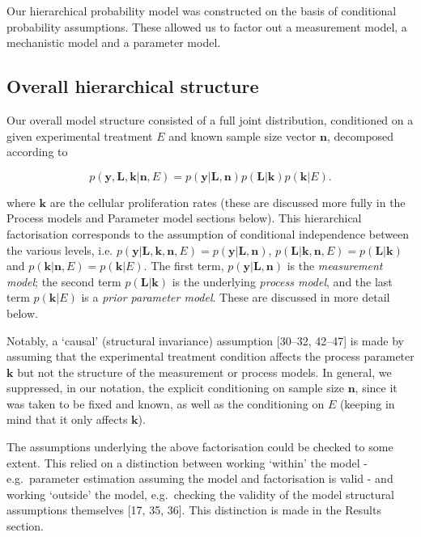 \documentclass[10pt,letterpaper]{article}
\begin{document}
Our hierarchical probability model was constructed on the basis of
conditional probability assumptions. These allowed us to factor out a
measurement model, a mechanistic model and a parameter model.

\subsection{Overall hierarchical
structure}\label{overall-hierarchical-structure}

Our overall model structure consisted of a full joint distribution,
conditioned on a given experimental treatment \(E\) and known sample
size vector \(\mathbf{n}\), decomposed according to

\begin{equation}p(\mathbf{y},\mathbf{L},\mathbf{k}|\mathbf{n},E) = p(\mathbf{y}|\mathbf{L},\mathbf{n})p(\mathbf{L}|\mathbf{k})p(\mathbf{k}|E).\label{eq:decomp}\end{equation}

where \(\mathbf{k}\) are the cellular proliferation rates (these are
discussed more fully in the Process models and Parameter model sections
below). This hierarchical factorisation corresponds to the assumption of
conditional independence between the various levels, i.e.
\(p(\mathbf{y}|\mathbf{L},\mathbf{k},\mathbf{n},E) = p(\mathbf{y}|\mathbf{L},\mathbf{n})\),
\(p(\mathbf{L}|\mathbf{k},\mathbf{n},E) = p(\mathbf{L}|\mathbf{k})\) and
\(p(\mathbf{k}|\mathbf{n},E) = p(\mathbf{k}|E)\). The first term,
\(p(\mathbf{y}|\mathbf{L},\mathbf{n})\) is the \emph{measurement model};
the second term \(p(\mathbf{L}|\mathbf{k})\) is the underlying
\emph{process model}, and the last term \(p(\mathbf{k}|E)\) is a
\emph{prior parameter model}. These are discussed in more detail below.

Notably, a `causal' (structural invariance) assumption {[}30--32,
42--47{]} is made by assuming that the experimental treatment condition
affects the process parameter \(\mathbf{k}\) but not the structure of
the measurement or process models. In general, we suppressed, in our
notation, the explicit conditioning on sample size \(\mathbf{n}\), since
it was taken to be fixed and known, as well as the conditioning on \(E\)
(keeping in mind that it only affects \(\mathbf{k}\)).

The assumptions underlying the above factorisation could be checked to
some extent. This relied on a distinction between working `within' the
model - e.g.~parameter estimation assuming the model and factorisation
is valid - and working `outside' the model, e.g.~checking the validity
of the model structural assumptions themselves {[}17, 35, 36{]}. This
distinction is made in the Results section.
\end{document}
